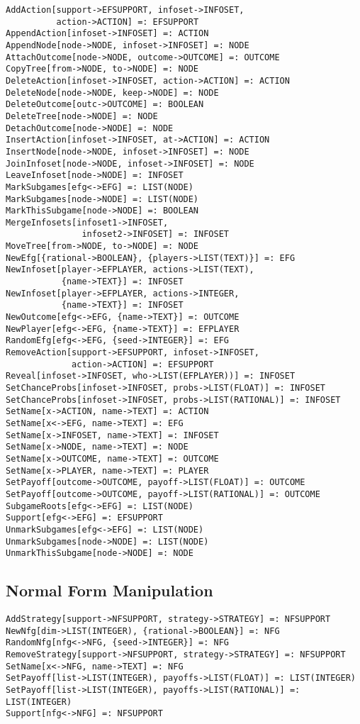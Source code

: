 \begin{verbatim}
AddAction[support->EFSUPPORT, infoset->INFOSET, 
          action->ACTION] =: EFSUPPORT
AppendAction[infoset->INFOSET] =: ACTION
AppendNode[node->NODE, infoset->INFOSET] =: NODE
AttachOutcome[node->NODE, outcome->OUTCOME] =: OUTCOME
CopyTree[from->NODE, to->NODE] =: NODE
DeleteAction[infoset->INFOSET, action->ACTION] =: ACTION
DeleteNode[node->NODE, keep->NODE] =: NODE
DeleteOutcome[outc->OUTCOME] =: BOOLEAN
DeleteTree[node->NODE] =: NODE
DetachOutcome[node->NODE] =: NODE
InsertAction[infoset->INFOSET, at->ACTION] =: ACTION
InsertNode[node->NODE, infoset->INFOSET] =: NODE
JoinInfoset[node->NODE, infoset->INFOSET] =: NODE
LeaveInfoset[node->NODE] =: INFOSET
MarkSubgames[efg<->EFG] =: LIST(NODE)
MarkSubgames[node->NODE] =: LIST(NODE)
MarkThisSubgame[node->NODE] =: BOOLEAN
MergeInfosets[infoset1->INFOSET,
               infoset2->INFOSET] =: INFOSET
MoveTree[from->NODE, to->NODE] =: NODE
NewEfg[{rational->BOOLEAN}, {players->LIST(TEXT)}] =: EFG
NewInfoset[player->EFPLAYER, actions->LIST(TEXT),
           {name->TEXT}] =: INFOSET
NewInfoset[player->EFPLAYER, actions->INTEGER,
           {name->TEXT}] =: INFOSET
NewOutcome[efg<->EFG, {name->TEXT}] =: OUTCOME
NewPlayer[efg<->EFG, {name->TEXT}] =: EFPLAYER 
RandomEfg[efg<->EFG, {seed->INTEGER}] =: EFG
RemoveAction[support->EFSUPPORT, infoset->INFOSET, 
             action->ACTION] =: EFSUPPORT
Reveal[infoset->INFOSET, who->LIST(EFPLAYER))] =: INFOSET
SetChanceProbs[infoset->INFOSET, probs->LIST(FLOAT)] =: INFOSET
SetChanceProbs[infoset->INFOSET, probs->LIST(RATIONAL)] =: INFOSET
SetName[x->ACTION, name->TEXT] =: ACTION
SetName[x<->EFG, name->TEXT] =: EFG
SetName[x->INFOSET, name->TEXT] =: INFOSET
SetName[x->NODE, name->TEXT] =: NODE
SetName[x->OUTCOME, name->TEXT] =: OUTCOME
SetName[x->PLAYER, name->TEXT] =: PLAYER
SetPayoff[outcome->OUTCOME, payoff->LIST(FLOAT)] =: OUTCOME
SetPayoff[outcome->OUTCOME, payoff->LIST(RATIONAL)] =: OUTCOME
SubgameRoots[efg<->EFG] =: LIST(NODE)
Support[efg<->EFG] =: EFSUPPORT
UnmarkSubgames[efg<->EFG] =: LIST(NODE)
UnmarkSubgames[node->NODE] =: LIST(NODE)
UnmarkThisSubgame[node->NODE] =: NODE
\end{verbatim}

\subsection{Normal Form Manipulation}

\begin{verbatim}
AddStrategy[support->NFSUPPORT, strategy->STRATEGY] =: NFSUPPORT
NewNfg[dim->LIST(INTEGER), {rational->BOOLEAN}] =: NFG
RandomNfg[nfg<->NFG, {seed->INTEGER}] =: NFG
RemoveStrategy[support->NFSUPPORT, strategy->STRATEGY] =: NFSUPPORT
SetName[x<->NFG, name->TEXT] =: NFG
SetPayoff[list->LIST(INTEGER), payoffs->LIST(FLOAT)] =: LIST(INTEGER)
SetPayoff[list->LIST(INTEGER), payoffs->LIST(RATIONAL)] =: LIST(INTEGER)
Support[nfg<->NFG] =: NFSUPPORT
\end{verbatim}

